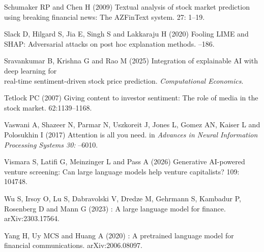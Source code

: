 \documentclass{aims}
\numberwithin{equation}{section}
\begin{document}
\begin{thebibliography}{}
\newblock Schumaker RP and Chen H (2009)
\newblock Textual analysis of stock market prediction using breaking financial
  news: The {AZFinText} system.
 27:
  1--19. 

\newblock Slack D, Hilgard S, Jia E, Singh S and Lakkaraju H (2020)
\newblock Fooling {LIME} and {SHAP}: Adversarial attacks on post hoc
  explanation methods.
--186. 

\newblock Sravankumar B, Krishna G and Rao M (2025)
\newblock Integration of explainable {AI} with deep learning for\\
real-time sentiment-driven stock price prediction.  {\em Computational Economics}.
\newblock {}

\newblock Tetlock PC (2007)
\newblock Giving content to investor sentiment: The role of media in the stock
  market.
 62:1139--1168. 

\newblock Vaswani A, Shazeer N, Parmar N, Uszkoreit J, Jones L, 
  Gomez AN, Kaiser L and Polosukhin I (2017)
\newblock Attention is all you need.
\newblock in {\em Advances in Neural Information Processing Systems 30:}
--6010. 

\newblock Vismara S, Latifi G, Meinzinger L and Pass A (2026)
\newblock Generative {AI}-powered venture screening: Can large language models help
  venture capitalists?
 109:
  104748. 
  
\newblock Wu S, Irsoy O, Lu S, Dabravolski V, Dredze M, Gehrmann S, Kambadur P, Rosenberg D and Mann G (2023)
: A large language model for finance.
\newblock arXiv:2303.17564. 

\newblock Yang H, Uy MCS and Huang A (2020)
: A pretrained language model for financial communications.
\newblock arXiv:2006.08097. 
  

\end{thebibliography}
\end{document}
